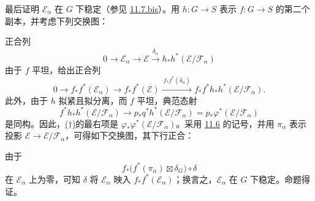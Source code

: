 最后证明 \(\mathcal E_\alpha\) 在 \(G\) 下稳定\textup{（参见 \hyperref[rem:sga3-VIB-11.7.bis]{11.7.bis}）}。用 \(h:G\to S\) 表示 \(f:G\to S\) 的第二个副本，并考虑下列交换图：
\begin{center}
  \label{diag:sga3-VIB-11.10bis-projections}%
\end{center}
正合列
\label{seq:sga3-VIB-11.10bis-first-exact}%
\[
  0\longrightarrow\mathcal E_\alpha
    \longrightarrow\mathcal E
    \xrightarrow{\ \overline{\delta}_\alpha\ }
    h_*h^*(\mathcal E/\mathcal F_\alpha)
\]
由于 \(f\) 平坦，给出正合列
\label{seq:sga3-VIB-11.10bis-dagger}%
\[
  \tag{\(\dagger\)}
  0\longrightarrow f_*f^*(\mathcal E_\alpha)
    \longrightarrow f_*f^*(\mathcal E)
    \xrightarrow{\ f_*f^*(\overline{\delta}_\alpha)\ }
    f_*f^*h_*h^*(\mathcal E/\mathcal F_\alpha).
\]
此外，由于 \(h\) 拟紧且拟分离，而 \(f\) 平坦，典范态射
\label{form:sga3-VIB-11.10bis-flat-base-change}%
\[
  f^*h_*h^*(\mathcal E/\mathcal F_\alpha)
    \longrightarrow
  p_*q^*h^*(\mathcal E/\mathcal F_\alpha)
    =p_*\varphi^*(\mathcal E/\mathcal F_\alpha)
\]
是同构。因此，\hyperref[seq:sga3-VIB-11.10bis-dagger]{\textup{(\(\dagger\))}}的最右项是 \(\varphi_*\varphi^*(\mathcal E/\mathcal F_\alpha)\)。采用 \hyperref[par:sga3-VIB-11.6]{11.6} 的记号，并用 \(\pi_\alpha\) 表示投影 \(\mathcal E\to\mathcal E/\mathcal F_\alpha\)，可得如下交换图，其下行正合：
\begin{center}
  \label{diag:sga3-VIB-11.10bis-stability}%
  {\small
  }
\end{center}
由于
\[
  f_*\bigl(f^*(\pi_\alpha)\boxtimes\delta_G\bigr)\circ\delta
\]
在 \(\mathcal E_\alpha\) 上为零，可知 \(\delta\) 将 \(\mathcal E_\alpha\) 映入 \(f_*f^*(\mathcal E_\alpha)\)；换言之，\(\mathcal E_\alpha\) 在 \(G\) 下稳定。命题得证。

